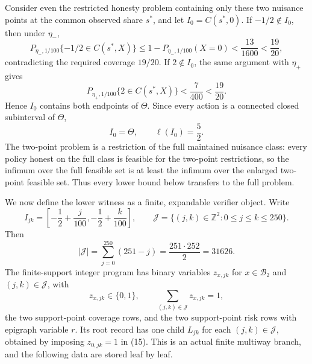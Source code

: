 Consider even the restricted honesty problem containing only these two nuisance points at the common observed share \(s^*\), and let \(I_0=C(s^*,0)\). If \(-1/2\notin I_0\), then under \(\eta_-\),
\[
 P_{\eta_-,1/100}\{-1/2\in C(s^*,X)\}
 \le 1-P_{\eta_-,1/100}(X=0)
 <\frac{13}{1600}<\frac{19}{20},
\tag{10}
\]
contradicting the required coverage \(19/20\). If \(2\notin I_0\), the same argument with \(\eta_+\) gives
\[
 P_{\eta_+,1/100}\{2\in C(s^*,X)\}
 <\frac7{400}<\frac{19}{20}.
\tag{11}
\]
Hence \(I_0\) contains both endpoints of \(\Theta\). Since every action is a connected closed subinterval of \(\Theta\),
\[
 I_0=\Theta,
 \qquad \ell(I_0)=\frac52.
\tag{12}
\]
The two-point problem is a restriction of the full maintained nuisance class: every policy honest on the full class is feasible for the two-point restrictions, so the infimum over the full feasible set is at least the infimum over the enlarged two-point feasible set. Thus every lower bound below transfers to the full problem.

We now define the lower witness as a finite, expandable verifier object. Write
\[
 I_{jk}=\left[-\frac12+\frac j{100},-\frac12+\frac k{100}\right],
 \qquad
 \mathscr J=\{(j,k)\in\mathbb Z^2:0\le j\le k\le250\}.
\tag{13}
\]
Then
\[
 |\mathscr J|=\sum_{j=0}^{250}(251-j)
 =\frac{251\cdot252}{2}=31626.
\tag{14}
\]
The finite-support integer program has binary variables \(z_{x,jk}\) for \(x\in\mathcal B_2\) and \((j,k)\in\mathscr J\), with
\[
 z_{x,jk}\in\{0,1\},
 \qquad
 \sum_{(j,k)\in\mathscr J}z_{x,jk}=1,
\tag{15}
\]
the two support-point coverage rows, and the two support-point risk rows with epigraph variable \(r\). Its root record has one child \(L_{jk}\) for each \((j,k)\in\mathscr J\), obtained by imposing \(z_{0,jk}=1\) in (15). This is an actual finite multiway branch, and the following data are stored leaf by leaf.

